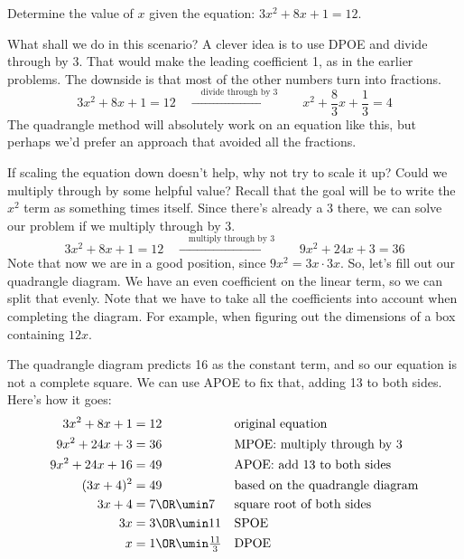\begin{boxedexplore}
Determine the value of $x$ given the equation: $3x^2 + 8x + 1 = 12$.
\end{boxedexplore} %

What shall we do in this scenario? A clever idea is to use DPOE and divide through by 3. That would make the leading coefficient 1, as in the earlier problems. The downside is that most of the other numbers turn into fractions.
\[3x^2 + 8x + 1 = 12
\quad\xrightarrow{\quad\text{divide through by 3}\quad}\quad
x^2 + \frac{8}{3}x + \frac{1}{3} = 4\]
The quadrangle method will absolutely work on an equation like this, but perhaps we'd prefer an approach that avoided all the fractions.

If scaling the equation down doesn't help, why not try to scale it up? Could we multiply through by some helpful value? Recall that the goal will be to write the $x^2$ term as something times itself. Since there's already a 3 there, we can solve our problem if we multiply through by 3.
\[3x^2 + 8x + 1 = 12
\quad\xrightarrow{\quad\text{multiply through by 3}\quad}\quad
9x^2 + 24x + 3 = 36\]
Note that now we are in a good position, since $9x^2 = 3x\cdot3x$. So, let's fill out our quadrangle diagram. We have an even coefficient on the linear term, so we can split that evenly. Note that we have to take all the coefficients into account when completing the diagram. For example, when figuring out the dimensions of a box containing $12x$.


The quadrangle diagram predicts 16 as the constant term, and so our equation is not a complete square. We can use APOE to fix that, adding 13 to both sides. Here's how it goes:
\begin{align*}
3x^2 +8x + 1 &= 12
&&\text{original equation}
\\
9x^2 + 24x + 3 &= 36
&&\text{MPOE: multiply through by 3}
\\
9x^2 +24x + 16 &= 49
&&\text{APOE: add 13 to both sides}
\\
(3x+4)^2 &= 49
&&\text{based on the quadrangle diagram}
\\
3x+4 &= 7 \OR \umin7
&&\text{square root of both sides}
\\
3x &= 3 \OR \umin11
&&\text{SPOE}
\\
x &= 1 \OR \umin\tfrac{11}{3}
&&\text{DPOE}
\end{align*}

